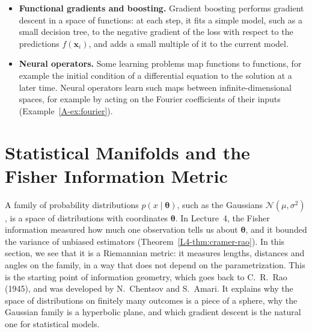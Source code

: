 \begin{itemize}
    \[\Theta(\mathbf{x}, \mathbf{x}') = \nabla_{\boldsymbol{\theta}}f(\mathbf{x}; \boldsymbol{\theta})^\top\nabla_{\boldsymbol{\theta}}f(\mathbf{x}'; \boldsymbol{\theta})\]
    describes how a gradient step on one example changes the prediction at another input. One can show that for infinitely wide networks with a suitably scaled random initialization, this kernel stays constant during training, and that training by gradient descent on the squared loss then amounts to kernel regression with this kernel. This connects deep learning with the kernel methods of this appendix, at least in this limit.
    \item \textbf{Functional gradients and boosting.} Gradient boosting performs gradient descent in a space of functions: at each step, it fits a simple model, such as a small decision tree, to the negative gradient of the loss with respect to the predictions $f(\mathbf{x}_i)$, and adds a small multiple of it to the current model.
    \item \textbf{Neural operators.} Some learning problems map functions to functions, for example the initial condition of a differential equation to the solution at a later time. Neural operators learn such maps between infinite-dimensional spaces, for example by acting on the Fourier coefficients of their inputs (Example~\ref{A-ex:fourier}).
\end{itemize}

\section{Statistical Manifolds and the Fisher Information Metric}\label{A-sec:fisher}

A family of probability distributions $p(x \mid \boldsymbol{\theta})$, such as the Gaussians $\mathcal{N}(\mu, \sigma^2)$, is a space of distributions with coordinates $\boldsymbol{\theta}$. In Lecture~4, the Fisher information measured how much one observation tells us about $\boldsymbol{\theta}$, and it bounded the variance of unbiased estimators (Theorem~\ref{L4-thm:cramer-rao}). In this section, we see that it is a Riemannian metric: it measures lengths, distances and angles on the family, in a way that does not depend on the parametrization. This is the starting point of information geometry, which goes back to C.~R.~Rao (1945), and was developed by N.~Chentsov and S.~Amari. It explains why the space of distributions on finitely many outcomes is a piece of a sphere, why the Gaussian family is a hyperbolic plane, and which gradient descent is the natural one for statistical models.

